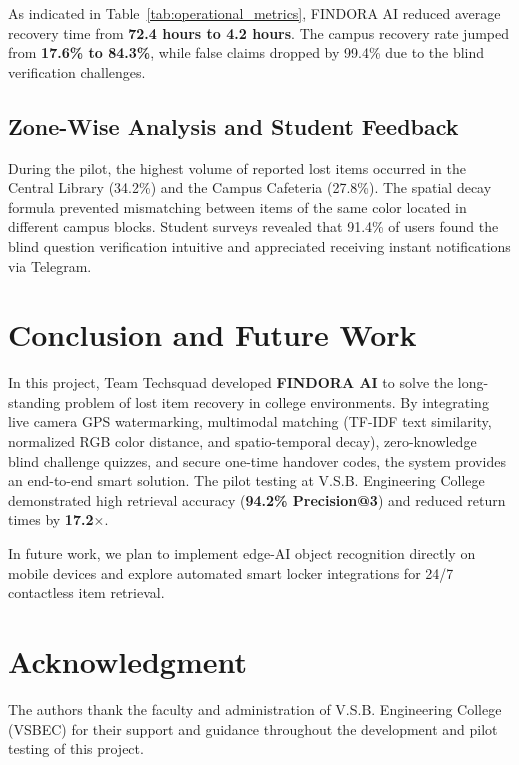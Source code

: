\documentclass[conference]{IEEEtran}
\begin{document}
As indicated in Table~\ref{tab:operational_metrics}, FINDORA AI reduced average recovery time from \textbf{72.4 hours to 4.2 hours}. The campus recovery rate jumped from \textbf{17.6\% to 84.3\%}, while false claims dropped by 99.4\% due to the blind verification challenges.

\subsection{Zone-Wise Analysis and Student Feedback}
During the pilot, the highest volume of reported lost items occurred in the Central Library (34.2\%) and the Campus Cafeteria (27.8\%). The spatial decay formula prevented mismatching between items of the same color located in different campus blocks. Student surveys revealed that 91.4\% of users found the blind question verification intuitive and appreciated receiving instant notifications via Telegram.

\section{Conclusion and Future Work}
In this project, Team Techsquad developed \textbf{FINDORA AI} to solve the long-standing problem of lost item recovery in college environments. By integrating live camera GPS watermarking, multimodal matching (TF-IDF text similarity, normalized RGB color distance, and spatio-temporal decay), zero-knowledge blind challenge quizzes, and secure one-time handover codes, the system provides an end-to-end smart solution. The pilot testing at V.S.B. Engineering College demonstrated high retrieval accuracy (\textbf{94.2\% Precision@3}) and reduced return times by \textbf{17.2$\times$}.

In future work, we plan to implement edge-AI object recognition directly on mobile devices and explore automated smart locker integrations for 24/7 contactless item retrieval.

\section*{Acknowledgment}
The authors thank the faculty and administration of V.S.B. Engineering College (VSBEC) for their support and guidance throughout the development and pilot testing of this project.

\balance
\end{document}
